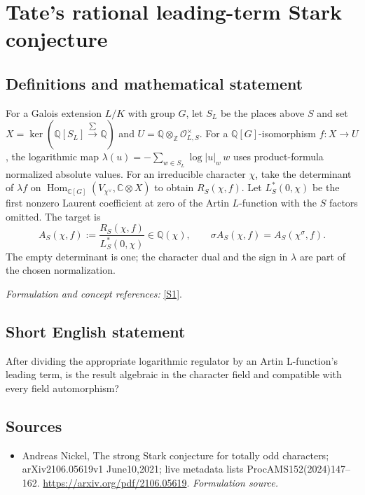 \documentclass[11pt]{article}
\begin{document}
\section*{\texorpdfstring{Tate's rational leading-term Stark conjecture}{Tate's rational leading-term Stark conjecture}}\label{166}
\subsection{Definitions and mathematical statement}
For a Galois extension $L/K$ with group $G$, let $S_L$ be the places above $S$ and set
$X=\ker({\mathbb{Q}}[S_L]\xrightarrow{\sum}{\mathbb{Q}})$ and
$U={\mathbb{Q}}\otimes_{{\mathbb{Z}}}\mathcal O_{L,S}^{\times}$. For a ${\mathbb{Q}}[G]$-isomorphism $f:X\to U$, the logarithmic map
$\lambda(u)=-\sum_{w\in S_L}\log|u|_w\,w$
uses product-formula normalized absolute values. For an irreducible character $\chi$, take the determinant of $\lambda f$ on
$\operatorname{Hom}_{{\mathbb{C}}[G]}(V_{\chi^\vee},{\mathbb{C}}\otimes X)$ to obtain $R_S(\chi,f)$. Let $L_S^*(0,\chi)$ be the first nonzero Laurent coefficient at zero of the Artin $L$-function with the $S$ factors omitted. The target is
\[
 A_S(\chi,f):=\frac{R_S(\chi,f)}{L_S^*(0,\chi)}\in{\mathbb{Q}}(\chi),
 \qquad\sigma A_S(\chi,f)=A_S(\chi^\sigma,f).
\]
The empty determinant is one; the character dual and the sign in $\lambda$ are part of the chosen normalization.
\par\smallskip\textit{Formulation and concept references:} \href{https://arxiv.org/pdf/2106.05619}{[S1]}.

\subsection{Short English statement}
After dividing the appropriate logarithmic regulator by an Artin L-function's leading term, is the result algebraic in the character field and compatible with every field automorphism?
\subsection{Sources}
\begin{itemize}
\item[S1]Andreas Nickel, The strong Stark conjecture for totally odd characters; arXiv2106.05619v1 June10,2021; live metadata lists ProcAMS152(2024)147–162.
\url{https://arxiv.org/pdf/2106.05619}.
\textit{Formulation source.}
\end{itemize}
\end{document}
